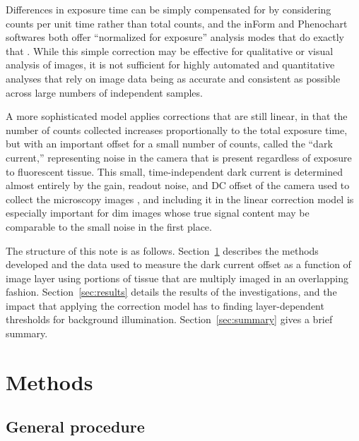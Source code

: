 \documentclass[letterpaper,11pt]{article}
\newcommand{\refsec}[1]{Section~\ref{#1}}
\begin{document}
Differences in exposure time can be simply compensated for by considering counts per unit time rather than total counts, and the inForm and Phenochart softwares both offer ``normalized for exposure'' analysis modes that do exactly that \cite{inform_user_manual,phenochart_user_manual}. While this simple correction may be effective for qualitative or visual analysis of images, it is not sufficient for highly automated and quantitative analyses that rely on image data being as accurate and consistent as possible across large numbers of independent samples. 

A more sophisticated model applies corrections that are still linear, in that the number of counts collected increases proportionally to the total exposure time, but with an important offset for a small number of counts, called the ``dark current,'' representing noise in the camera that is present regardless of exposure to fluorescent tissue. This small, time-independent dark current is determined almost entirely by the gain, readout noise, and DC offset of the camera used to collect the microscopy images \cite{doi:10.1111/j.1365-2818.2011.03581.x}, and including it in the linear correction model is especially important for dim images whose true signal content may be comparable to the small noise in the first place.

The structure of this note is as follows. \refsec{sec:methods} describes the methods developed and the data used to measure the dark current offset as a function of image layer using portions of tissue that are multiply imaged in an overlapping fashion. \refsec{sec:results} details the results of the investigations, and the impact that applying the correction model has to finding layer-dependent thresholds for background illumination. \refsec{sec:summary} gives a brief summary.

\section{Methods}
\label{sec:methods}

\subsection{General procedure}
\label{ssec:general_procedure}
\end{document}
